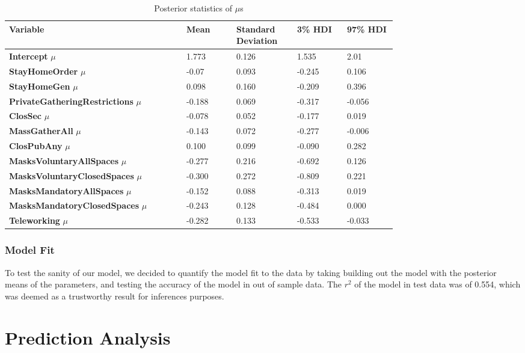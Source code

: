 \documentclass{article}
\begin{document}
\begin{table}[H]
        \centering
        \caption{Posterior statistics of $\mu$s}\label{tab:responses}
        \begin{tabular}{p{0.35\linewidth}  p{0.1\linewidth} p{0.1\linewidth} p{0.1\linewidth} p{0.1\linewidth}}
            \toprule
            Variable & Mean & Standard Deviation & 3\% HDI & 97\% HDI\\
            \hline
            \textbf{Intercept} $\mu$ & 1.773 & 0.126 & 1.535 & 2.01 \\
            \textbf{StayHomeOrder} $\mu$ & -0.07 & 0.093 & -0.245 & 0.106 \\
            \textbf{StayHomeGen} $\mu$ & 0.098 & 0.160	& -0.209 & 0.396\\
            \textbf{PrivateGatheringRestrictions} $\mu$ & -0.188 &0.069&-0.317&-0.056	\\
            \textbf{ClosSec} $\mu$ &  -0.078&0.052&-0.177&0.019\\
            \textbf{MassGatherAll} $\mu$ & -0.143&0.072&-0.277&-0.006 \\
            \textbf{ClosPubAny} $\mu$ & 0.100&0.099&-0.090&0.282  \\
            \textbf{MasksVoluntaryAllSpaces} $\mu$ & -0.277&0.216&-0.692&0.126 \\
            \textbf{MasksVoluntaryClosedSpaces} $\mu$ & -0.300&0.272&-0.809&0.221\\
            \textbf{MasksMandatoryAllSpaces} $\mu$ & -0.152&0.088&-0.313&0.019 \\
            \textbf{MasksMandatoryClosedSpaces} $\mu$ & -0.243&0.128&-0.484&0.000 \\
            \textbf{Teleworking} $\mu$ & -0.282&0.133&-0.533&-0.033	 \\
            \bottomrule
        \end{tabular}
\end{table}

\subsubsection{Model Fit}
To test the sanity of our model, we decided to quantify the model fit to the data by taking building out the model with the posterior means of the parameters, and testing the accuracy of the model in out of sample data. The $r^2$ of the model in test data was of 0.554, which was deemed as a trustworthy result for inferences purposes.

\section{Prediction Analysis}
\end{document}

